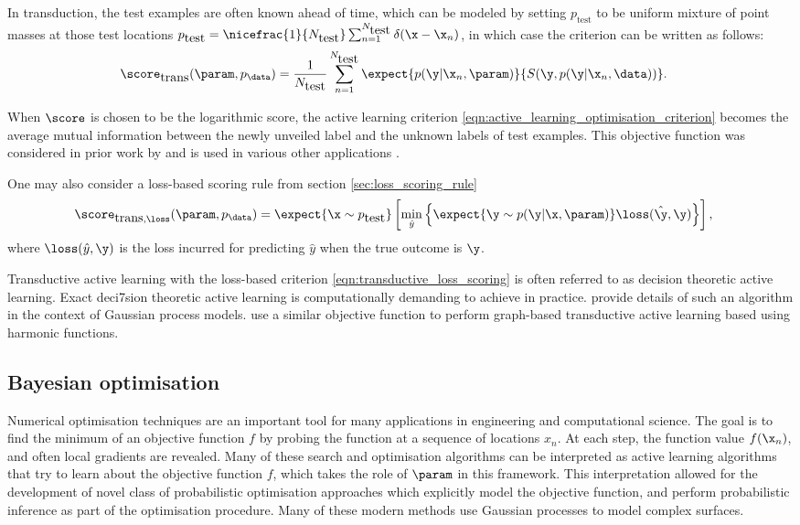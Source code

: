 In transduction, the test examples are often known ahead of time, which can be modeled by setting $p_{\mbox{test}}$ to be uniform mixture of point masses at those test locations $p_{\mbox{test}} = \nicefrac{1}{N_{\mbox{test}}}\sum_{n=1}^{N_{\mbox{test}}} \delta(\x - \x_n)$, in which case the criterion can be written as follows:
%
\begin{align}
	\score_{\mbox{trans}}(\param,p_\data) &= \frac{1}{N_{\mbox{test}}}\sum_{n=1}^{N_{\mbox{test}}} \expect{p(\y\vert\x_n,\param)}{S(\y,p(\y\vert\x_n,\data))}.
\end{align}

When $\score$ is chosen to be the logarithmic score, the active learning criterion \eqref{eqn:active_learning_optimisation_criterion} becomes the average mutual information between the newly unveiled label and the unknown labels of test examples. This objective function was considered in prior work by \citet{MacKay1992} and is used in various other applications \citep[see \eg][]{Ertin2003,Fuhrmann2003}.

One may also consider a loss-based scoring rule from section \ref{sec:loss_scoring_rule}
%
\begin{align}
	\score_{\mbox{trans},\loss}(\param,p_\data) &= \expect{\x\sim p_{\mbox{test}}}\left[ \min_{\hat{y}} \left\{\expect{\y\sim p(\y\vert\x,\param)} \loss(\hat{\y},\y) \right\} \right],\label{eqn:transductive_loss_scoring}
\end{align}
%
where $\loss(\hat{y},\y)$ is the loss incurred for predicting $\hat{y}$ when the true outcome is $\y$.

Transductive active learning with the loss-based criterion \eqref{eqn:transductive_loss_scoring} is often referred to as decision theoretic active learning. Exact deci7sion theoretic active learning is computationally demanding to achieve in practice. \citet{Kapoor2007} provide details of such an algorithm in the context of Gaussian process models. \citet{Zhu2003active} use a similar objective function to perform graph-based transductive active learning based using harmonic functions.

\subsection{Bayesian optimisation}

Numerical optimisation techniques are an important tool for many applications in engineering and computational science.
The goal is to find the minimum of an objective function $f$ by probing the function at a sequence of locations $x_n$. At each step, the function value $f(\x_n)$, and often local gradients are revealed. Many of these search and optimisation algorithms can be interpreted as active learning algorithms that try to learn about the objective function $f$, which takes the role of $\param$ in this framework. This interpretation allowed for the development of novel class of probabilistic optimisation approaches which explicitly model the objective function, and perform probabilistic inference as part of the optimisation procedure. Many of these modern methods use Gaussian processes to model complex surfaces.

